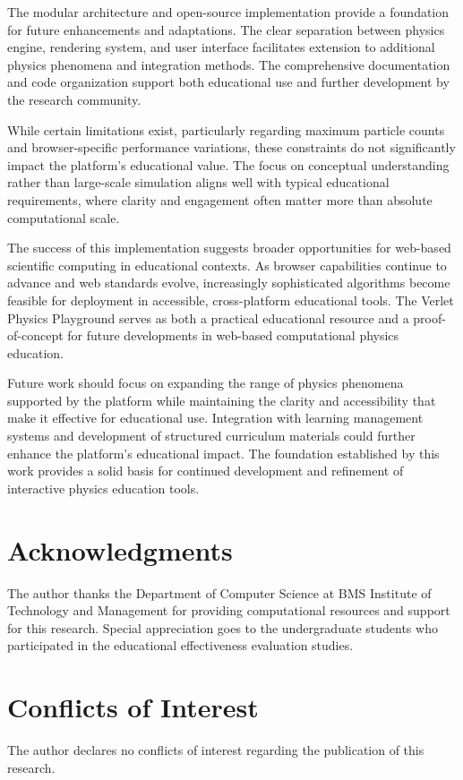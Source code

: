 \documentclass[12pt,journal,onecolumn]{IEEEtran}
\begin{document}
The modular architecture and open-source implementation provide a foundation for future enhancements and adaptations. The clear separation between physics engine, rendering system, and user interface facilitates extension to additional physics phenomena and integration methods. The comprehensive documentation and code organization support both educational use and further development by the research community.

While certain limitations exist, particularly regarding maximum particle counts and browser-specific performance variations, these constraints do not significantly impact the platform's educational value. The focus on conceptual understanding rather than large-scale simulation aligns well with typical educational requirements, where clarity and engagement often matter more than absolute computational scale.

The success of this implementation suggests broader opportunities for web-based scientific computing in educational contexts. As browser capabilities continue to advance and web standards evolve, increasingly sophisticated algorithms become feasible for deployment in accessible, cross-platform educational tools. The Verlet Physics Playground serves as both a practical educational resource and a proof-of-concept for future developments in web-based computational physics education.

Future work should focus on expanding the range of physics phenomena supported by the platform while maintaining the clarity and accessibility that make it effective for educational use. Integration with learning management systems and development of structured curriculum materials could further enhance the platform's educational impact. The foundation established by this work provides a solid basis for continued development and refinement of interactive physics education tools.

\section*{Acknowledgments}
The author thanks the Department of Computer Science at BMS Institute of Technology and Management for providing computational resources and support for this research. Special appreciation goes to the undergraduate students who participated in the educational effectiveness evaluation studies.

\section*{Conflicts of Interest}
The author declares no conflicts of interest regarding the publication of this research.
\end{document}
